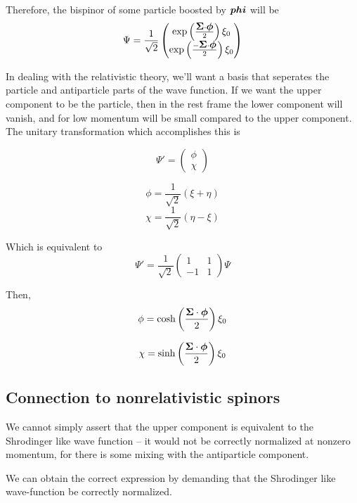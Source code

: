 Therefore, the bispinor of some particle boosted by $\mbox{\boldmath$ phi $}$ will be
\[
\Psi = \frac{1}{\sqrt{2}} \begin{pmatrix} 
		\exp\left( \frac{\mbox{\boldmath$ \Sigma $} \cdot \mbox{\boldmath$ \phi $} }{2} \right)\xi_0 \\ 
		\exp \left( \frac{-\mbox{\boldmath$ \Sigma $} \cdot \mbox{\boldmath$ \phi $} }{2} \right) \xi_0 
	\end{pmatrix}
\]


In dealing with the relativistic theory, we'll want a basis that seperates the particle and antiparticle parts of the wave function.  If we want the upper component to be the particle, then in the rest frame the lower component will vanish, and for low momentum will be small compared to the upper component.  The unitary transformation which accomplishes this is

\[
	\Psi' = \begin{pmatrix} \phi \\ \chi \end{pmatrix}
\]

\[
	\phi = \frac{1}{\sqrt{2}}(\xi + \eta)
\]
\[
	\chi = \frac{1}{\sqrt{2}}( \eta - \xi)
\]

Which is equivalent to
\[
	\Psi' = \frac{1}{\sqrt{2}} \begin{pmatrix}1 & 1 \\ -1 & 1 \end{pmatrix} \Psi
\]

Then,
\[
	\phi =  \cosh \left( \frac{\mbox{\boldmath$ \Sigma $} \cdot \mbox{\boldmath$ \phi $} }{2} \right ) \xi_0
\]

\[
	\chi =  \sinh \left( \frac{\mbox{\boldmath$ \Sigma $} \cdot \mbox{\boldmath$ \phi $} }{2} \right ) \xi_0
\]

\subsection{Connection to nonrelativistic spinors}


We cannot simply assert that the upper component is equivalent to the Shrodinger like wave function -- it would not be correctly normalized at nonzero momentum, for there is some mixing with the antiparticle component.

We can obtain the correct expression by demanding that the Shrodinger like wave-function be correctly normalized.






